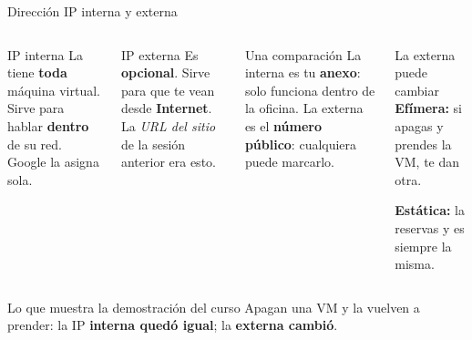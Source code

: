 \documentclass[aspectratio=169,10pt,c]{beamer}
\begin{document}
\begin{frame}{Dirección IP interna y externa}
\begin{columns}[T,onlytextwidth]
\begin{block}{IP interna}
\small La tiene \textbf{toda} máquina virtual. Sirve para hablar \textbf{dentro} de su red. Google la asigna sola.
\end{block}
\begin{block}{IP externa}
\small Es \textbf{opcional}. Sirve para que te vean desde \textbf{Internet}. La \emph{URL del sitio} de la sesión anterior era esto.
\end{block}
\begin{exampleblock}{Una comparación}
\small La interna es tu \textbf{anexo}: solo funciona dentro de la oficina. La externa es el \textbf{número público}: cualquiera puede marcarlo.
\end{exampleblock}
\begin{alertblock}{La externa puede cambiar}
\small \textbf{Efímera:} si apagas y prendes la VM, te dan otra.\par
\textbf{Estática:} la reservas y es siempre la misma.
\end{alertblock}
\end{columns}
\par\vspace{1mm}
\begin{block}{Lo que muestra la demostración del curso}
\small Apagan una VM y la vuelven a prender: la IP \textbf{interna quedó igual}; la \textbf{externa cambió}.
\end{block}
\end{frame}
\end{document}
